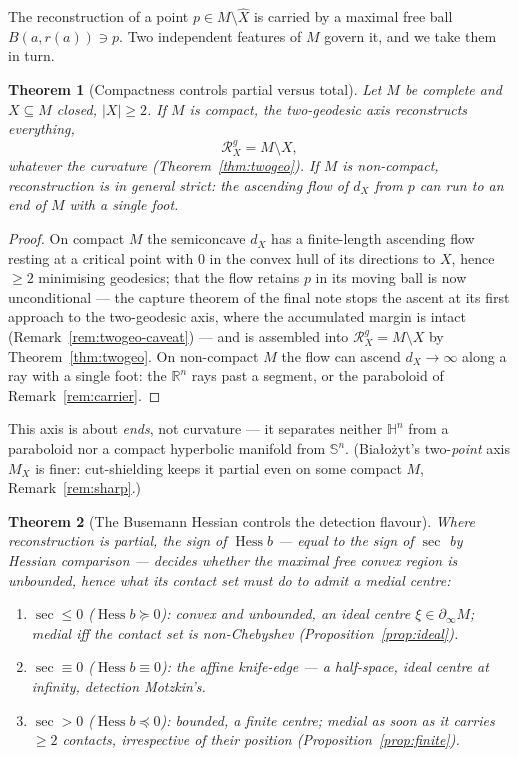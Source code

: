 \documentclass[11pt]{article}
\newtheorem{theorem}{Theorem}[section]
\theoremstyle{remark}
\newcommand{\R}{\mathbb{R}}
\newcommand{\X}{X}
\newcommand{\Xhat}{\widehat{\X}}
\newcommand{\Mx}{M_{\X}}
\newcommand{\Rx}{\mathcal{R}_{\X}}
\newcommand{\sect}{\operatorname{sec}}
\newcommand{\Hess}{\operatorname{Hess}}
\newcommand{\bdry}{\partial_{\infty}}
\newcommand{\HH}{\mathbb{H}}
\newcommand{\Sn}{\mathbb{S}^{n}}
\begin{document}
The reconstruction of a point $p\in M\setminus\Xhat$ is carried by a
maximal free ball $B(a,r(a))\ni p$. Two independent features of $M$ govern
it, and we take them in turn.

\begin{theorem}[Compactness controls partial versus total]\label{thm:compact}
Let $M$ be complete and $\X\subseteq M$ closed, $|\X|\ge2$. If $M$ is
\emph{compact}, the two-geodesic axis reconstructs everything,
\[
  \Rx^{g}=M\setminus\X ,
\]
whatever the curvature \textup{(}Theorem~\ref{thm:twogeo}\textup{)}. If $M$
is \emph{non-compact}, reconstruction is in general strict: the ascending
flow of $d_{\X}$ from $p$ can run to an end of $M$ with a single foot.
\end{theorem}

\begin{proof}
On compact $M$ the semiconcave $d_{\X}$ has a finite-length ascending flow
resting at a critical point with $0$ in the convex hull of its directions
to $\X$, hence $\ge2$ minimising geodesics; that the flow retains $p$ in
its moving ball is now unconditional --- the capture theorem of the final
note \cite[Thm.~3.1]{C} stops the ascent at its first approach to the
two-geodesic axis, where the accumulated margin is intact
(Remark~\ref{rem:twogeo-caveat}) --- and is assembled into
$\Rx^{g}=M\setminus\X$ by Theorem~\ref{thm:twogeo}. On
non-compact $M$ the flow can ascend $d_{\X}\to\infty$ along a ray with a
single foot: the $\R^{n}$ rays past a segment, or the paraboloid of
Remark~\ref{rem:carrier}.
\end{proof}

\noindent This axis is about \emph{ends}, not curvature --- it separates
neither $\HH^{n}$ from a paraboloid nor a compact hyperbolic manifold from
$\Sn$. (Bia\l{}o\.zyt's two-\emph{point} axis $\Mx$ is finer: cut-shielding
keeps it partial even on some compact $M$, Remark~\ref{rem:sharp}.)

\begin{theorem}[The Busemann Hessian controls the detection flavour]
\label{thm:flavour}
Where reconstruction is partial, the sign of $\Hess b$ --- equal to the
sign of $\sect$ by Hessian comparison --- decides whether the maximal free
\emph{convex} region is unbounded, hence what its contact set must do to
admit a medial centre:
\begin{enumerate}[label=\textup{(\roman*)}]
\item $\sect\le0$ \textup{(}$\Hess b\succeq0$\textup{)}: convex and
\emph{unbounded}, an \emph{ideal} centre $\xi\in\bdry M$; medial iff the
contact set is non-Chebyshev \textup{(}Proposition~\ref{prop:ideal}\textup{)}.
\item $\sect\equiv0$ \textup{(}$\Hess b\equiv0$\textup{)}: the affine
knife-edge --- a half-space, ideal centre at infinity, detection Motzkin's.
\item $\sect>0$ \textup{(}$\Hess b\preceq0$\textup{)}: \emph{bounded}, a
\emph{finite} centre; medial as soon as it carries $\ge2$ contacts,
irrespective of their position \textup{(}Proposition~\ref{prop:finite}\textup{)}.
\end{enumerate}
\end{theorem}
\end{document}

